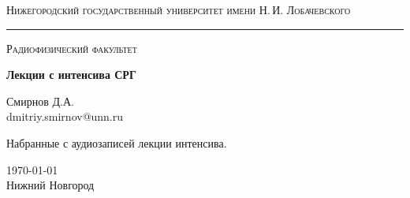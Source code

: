 \begin{titlepage}
\thispagestyle{empty}

\begin{center}
	{\small\textsc{Нижегородский государственный университет имени Н.\,И. Лобачевского}}
	\vskip 3pt \hrule \vskip 5pt
	{\small\textsc{Радиофизический факультет}}

	\vfill

	\begin{spacing}{2}
	{\Huge \bf  Лекции с интенсива СРГ}\\%
	\end{spacing}
	\vspace{1em}
	{\Large Смирнов Д.А.}\\[2em]
	{\large dmitriy.smirnov@unn.ru}\\
	\vspace{1em}
\end{center}

\begin{center}
	Набранные с аудиозаписей лекции интенсива. 
\end{center}


\begin{center}
	\vfill
	\today\\Нижний Новгород
\end{center}

\end{titlepage}